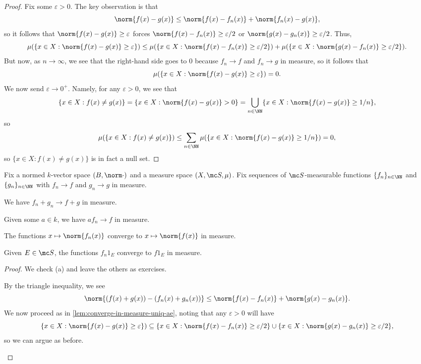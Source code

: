 \documentclass[../notes.tex]{subfiles}
\begin{document}
\begin{proof}
	Fix some $\varepsilon>0$. The key observation is that
	\[\norm{f(x)-g(x)}\le\norm{f(x)-f_n(x)}+\norm{f_n(x)-g(x)},\]
	so it follows that $\norm{f(x)-g(x)}\ge\varepsilon$ forces $\norm{f(x)-f_n(x)}\ge\varepsilon/2$ or $\norm{g(x)-g_n(x)}\ge\varepsilon/2$. Thus,
	\[\mu(\{x\in X:\norm{f(x)-g(x)}\ge\varepsilon\})\le\mu(\{x\in X:\norm{f(x)-f_n(x)}\ge\varepsilon/2\})+\mu(\{x\in X:\norm{g(x)-f_n(x)}\ge\varepsilon/2\}).\]
	But now, as $n\to\infty$, we see that the right-hand side goes to $0$ because $f_n\to f$ and $f_n\to g$ in measure, so it follows that
	\[\mu(\{x\in X:\norm{f(x)-g(x)}\ge\varepsilon\})=0.\]
	We now send $\varepsilon\to0^+$. Namely, for any $\varepsilon>0$, we see that
	\[\{x\in X:f(x)\ne g(x)\}=\{x\in X:\norm{f(x)-g(x)}>0\}=\bigcup_{n\in\NN}\{x\in X:\norm{f(x)-g(x)}\ge1/n\},\]
	so
	\[\mu(\{x\in X:f(x)\ne g(x)\})\le\sum_{n\in\NN}\mu(\{x\in X:\norm{f(x)-g(x)}\ge1/n\})=0,\]
	so $\{x\in X:f(x)\ne g(x)\}$ is in fact a null set.
\end{proof}
\begin{lemma}
	Fix a normed $k$-vector space $(B,\norm\cdot)$ and a measure space $(X,\mc S,\mu)$. Fix sequences of $\mc S$-measurable functions $\{f_n\}_{n\in\NN}$ and $\{g_n\}_{n\in\NN}$ with $f_n\to f$ and $g_n\to g$ in measure.
	\begin{listalph}
		\item We have $f_n+g_n\to f+g$ in measure.
		\item Given some $a\in k$, we have $af_n\to f$ in measure.
		\item The functions $x\mapsto\norm{f_n(x)}$ converge to $x\mapsto\norm{f(x)}$ in measure.
		\item Given $E\in\mc S$, the functions $f_n1_E$ converge to $f1_E$ in measure.
	\end{listalph}
\end{lemma}
\begin{proof}
	We check (a) and leave the others as exercises.
	\begin{listalph}
		\item By the triangle inequality, we see
		\[\norm{(f(x)+g(x))-(f_n(x)+g_n(x))}\le\norm{f(x)-f_n(x)}+\norm{g(x)-g_n(x)}.\]
		We now proceed as in \autoref{lem:converge-in-measure-uniq-ae}, noting that any $\varepsilon>0$ will have
		\[\{x\in X:\norm{f(x)-g(x)}\ge\varepsilon\})\subseteq\{x\in X:\norm{f(x)-f_n(x)}\ge\varepsilon/2\}\cup\{x\in X:\norm{g(x)-g_n(x)}\ge\varepsilon/2\},\]
		so we can argue as before.
		\qedhere
	\end{listalph}
\end{proof}
\end{document}
